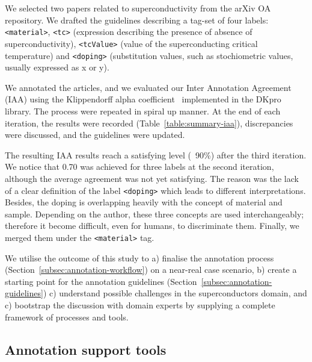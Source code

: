 \documentclass[fleqn,10pt]{wlscirep}
\begin{document}
We selected two papers related to superconductivity from the arXiv OA repository. 
We drafted the guidelines describing a tag-set of four labels: \texttt{<material>}, \texttt{<tc>} (expression describing the presence of absence of superconductivity), \texttt{<tcValue>} (value of the superconducting critical temperature) and \texttt{<doping>} (substitution values, such as stochiometric values, usually expressed as x or y). 

We annotated the articles, and we evaluated our Inter Annotation Agreement (IAA) using the Klippendorff alpha  coefficient~\cite{Krippendorff2004ReliabilityIC,Zapf2016MeasuringIR} implemented in the DKpro~\cite{Meyer2014DKProAA} library. 
The process were repeated in spiral up manner.  At the end of each iteration, the results were recorded (Table~\ref{table:summary-iaa}), discrepancies were discussed, and the guidelines were updated.


The resulting IAA results reach a satisfying level (~90\%) after the third iteration. 
We notice that 0.70 was achieved for three labels at the second iteration, although the average agreement was not yet satisfying. 
The reason was the lack of a clear definition of the label \texttt{<doping>} which leads to different interpretations. Besides, the doping is overlapping heavily with the concept of material and sample. Depending on the author, these three concepts are used interchangeably; therefore it become difficult, even for humans, to discriminate them. Finally, we merged them under the \texttt{<material>} tag. 

We utilise the outcome of this study to a) finalise the annotation process (Section~\ref{subsec:annotation-workflow}) on a near-real case scenario, b) create a starting point for the annotation guidelines (Section~\ref{subsec:annotation-guidelines}) c) understand possible challenges in the superconductors domain, and c) bootstrap the discussion with domain experts by supplying a complete framework of processes and tools. 

\subsection*{Annotation support tools}
\label{subsec:annotation-support-tool}
\end{document}
